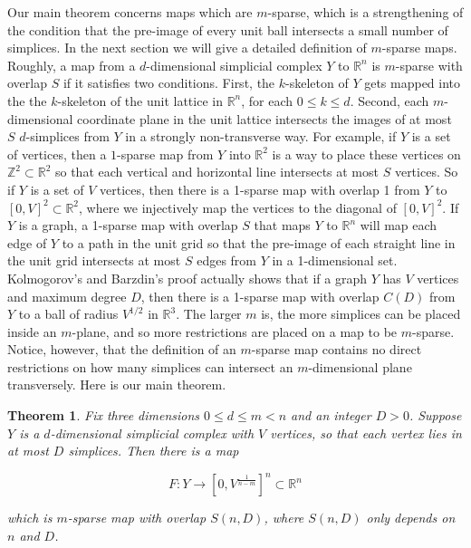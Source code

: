 \documentclass[12pt]{article}
\newtheorem{theorem}{Theorem}
\newcommand{\ZZ}{\mathbb{Z}}
\newcommand{\RR}{\mathbb{R}}
\begin{document}
	Our main theorem concerns maps which are $m$-sparse, which is a strengthening of the condition that the pre-image of every unit ball intersects a small number of simplices. In the next section we will give a detailed definition of $m$-sparse maps. Roughly, a map from a $d$-dimensional simplicial complex $Y$ to $\RR^n$ is $m$-sparse with overlap $S$ if it satisfies two conditions. First, the $k$-skeleton of $Y$ gets mapped into the the $k$-skeleton of the unit lattice in $\RR^n$, for each $0 \le k \le d$. Second, each $m$-dimensional coordinate plane in the unit lattice intersects the images of at most $S$ $d$-simplices from $Y$ in a strongly non-transverse way. For example, if $Y$ is a set of vertices, then a $1$-sparse map from $Y$ into $\RR^2$ is a way to place these vertices on $\ZZ^2 \subset \RR^2$ so that each vertical and horizontal line intersects at most $S$ vertices. So if $Y$ is a set of $V$ vertices, then there is a 1-sparse map with overlap 1 from $Y$ to $[0,V]^2 \subset \RR^2$, where we injectively map the vertices to the diagonal of $[0,V]^2$. If $Y$ is a graph, a 1-sparse map with overlap $S$ that maps $Y$ to $\RR^n$ will map each edge of $Y$ to a path in the unit grid so that the pre-image of each straight line in the unit grid intersects at most $S$ edges from $Y$ in a 1-dimensional set. Kolmogorov's and Barzdin's proof actually shows that if a graph $Y$ has $V$ vertices and maximum degree $D$, then there is a 1-sparse map with overlap $C(D)$ from $Y$ to a ball of radius $V^{1/2}$ in $\RR^3$.  The larger $m$ is, the more simplices can be placed inside an $m$-plane, and so more restrictions are placed on a map to be $m$-sparse. Notice, however, that the definition of an $m$-sparse map contains no direct restrictions on how many simplices can intersect an $m$-dimensional plane transversely. Here is our main theorem. 
	
	\begin{theorem} \label{sparse} Fix three dimensions $0 \le d \le m < n$ and an integer $D > 0$. Suppose $Y$ is a $d$-dimensional simplicial complex with $V$ vertices, so that each vertex lies in at most $D$ simplices. Then there is a map
		
		$$F: Y \to [0, V^{\frac{1}{n-m}}]^{n} \subset \mathbb{R}^{n}$$
		
		\noindent which is $m$-sparse map with overlap $S(n,D)$, where $S(n,D)$ only depends on $n$ and $D$.
	\end{theorem}
	
\end{document}

